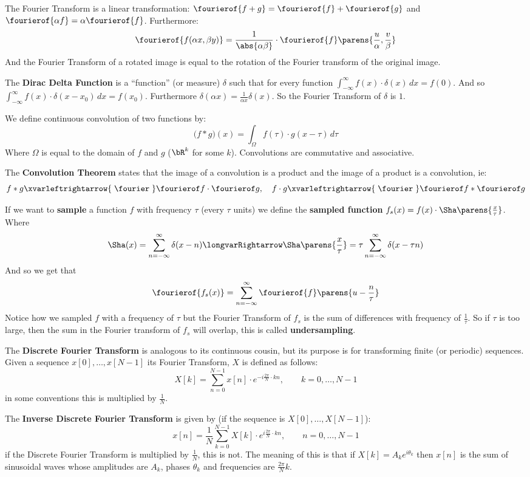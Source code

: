 \documentclass[10pt, twocolumn]{article}
\let\bold=\textbf
\begin{document}
The Fourier Transform is a linear transformation: $\fourierof{f+g}=\fourierof{f}+\fourierof{g}$ and $\fourierof{\alpha f}=\alpha\fourierof{f}$.
Furthermore:
$$\fourierof{f(\alpha x,\beta y)}=\frac1{\abs{\alpha\beta}}\cdot\fourierof{f}\parens{\frac u\alpha,\frac v\beta} $$
And the Fourier Transform of a rotated image is equal to the rotation of the Fourier transform of the original image.

The \bold{Dirac Delta Function} is a ``function'' (or measure) $\delta$ such that for every function $\int_{-\infty}^\infty f(x)\cdot\delta(x)\,dx = f(0)$.
\hfill\break And so $\int_{-\infty}^\infty f(x)\cdot\delta(x-x_0)\,dx = f(x_0)$.
Furthermore $\delta(\alpha x)=\frac1{\alpha x}\delta(x)$.
So the Fourier Transform of $\delta$ is $1$.

We define continuous convolution of two functions by:
$$ \bigl(f\ast g\bigr)(x) = \int_\Omega f(\tau)\cdot g(x-\tau)\,d\tau $$
Where $\Omega$ is equal to the domain of $f$ and $g$ ($\bR^k$ for some $k$).
Convolutions are commutative and associative.

The \bold{Convolution Theorem} states that the image of a convolution is a product and the image of a product is a convolution, ie:
$$ f\ast g\xvarleftrightarrow{\;\fourier\;}\fourierof f\cdot\fourierof g,\quad f\cdot g\xvarleftrightarrow{\;\fourier\;}\fourierof f\ast\fourierof g $$

If we want to \bold{sample} a function $f$ with frequency $\tau$ (every $\tau$ units) we define the \bold{sampled function} $f_s(x)=f(x)\cdot\Sha\parens{\frac x\tau}$.
Where
$$ \Sha(x) = \sum_{n=-\infty}^\infty \delta(x-n) \longvarRightarrow \Sha\parens{\frac x\tau} = \tau\sum_{n=-\infty}^\infty\delta(x-\tau n) $$
And so we get that
$$ \fourierof{f_s(x)} = \sum_{n=-\infty}^\infty \fourierof{f}\parens{u-\frac n\tau} $$
Notice how we sampled $f$ with a frequency of $\tau$ but the Fourier Transform of $f_s$ is the sum of differences with frequency of $\frac1\tau$.
So if $\tau$ is too large, then the sum in the Fourier transform of $f_s$ will overlap, this is called \bold{undersampling}.

The \bold{Discrete Fourier Transform} is analogous to its continuous cousin, but its purpose is for transforming finite (or periodic) sequences.
Given a sequence $x[0],\dots,x[N-1]$ its Fourier Transform, $X$ is defined as follows:
$$ X[k] = \sum_{n=0}^{N-1} x[n]\cdot e^{-i\frac{2\pi}N\cdot kn},\qquad k=0,\dots,N-1 $$
in some conventions this is multiplied by $\frac1N$.

The \bold{Inverse Discrete Fourier Transform} is given by (if the sequence is $X[0],\dots,X[N-1]$):
$$ x[n] = \frac1N\sum_{k=0}^{N-1}X[k]\cdot e^{i\frac{2\pi}N\cdot kn},\qquad n=0,\dots,N-1 $$
if the Discrete Fourier Transform is multiplied by $\frac1N$, this is not.
The meaning of this is that if $X[k]=A_ke^{i\theta_k}$ then $x[n]$ is the sum of sinusoidal waves whose amplitudes are $A_k$, phases $\theta_k$ and frequencies are $\frac{2\pi}Nk$.
\end{document}
